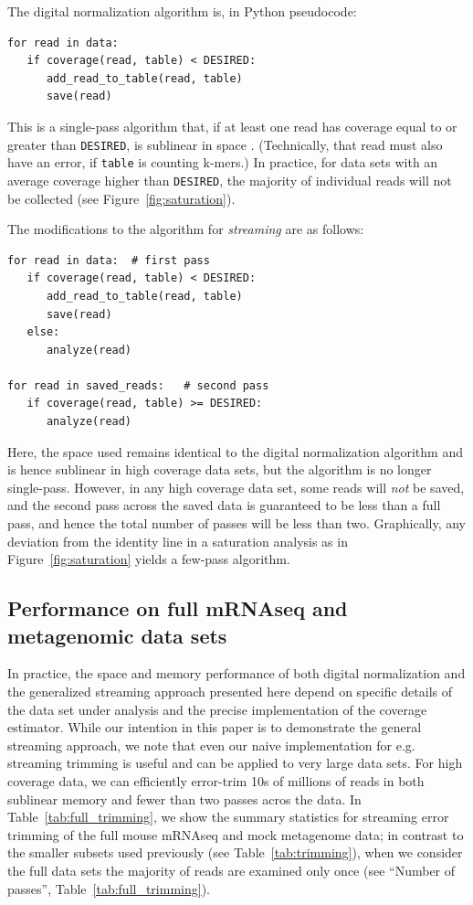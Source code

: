\documentclass{article}
\begin{document}
The digital normalization algorithm is, in Python pseudocode:
\begin{verbatim}
for read in data:
   if coverage(read, table) < DESIRED:
      add_read_to_table(read, table)
      save(read)
\end{verbatim}
This is a single-pass algorithm that, if at least one read has
coverage equal to or greater than {\tt DESIRED}, is sublinear in
space \cite{Brown2012}.  (Technically, that read must also have
an error, if {\tt table} is counting k-mers.)  In practice, for data
sets with an average coverage higher than {\tt DESIRED}, the majority
of individual reads will not be collected (see Figure~\ref{fig:saturation}).

The modifications to the algorithm for {\em streaming} are as follows:
\begin{verbatim}
for read in data:  # first pass
   if coverage(read, table) < DESIRED:
      add_read_to_table(read, table)
      save(read)
   else:
      analyze(read)

for read in saved_reads:   # second pass
   if coverage(read, table) >= DESIRED:
      analyze(read)
\end{verbatim}

Here, the space used remains identical to the digital normalization
algorithm and is hence sublinear in high coverage data sets, but the
algorithm is no longer single-pass.  However, in any high coverage
data set, some reads will {\em not} be saved, and the second pass
across the saved data is guaranteed to be less than a full pass, and
hence the total number of passes will be less than two.  Graphically,
any deviation from the identity line in a saturation analysis as in
Figure~\ref{fig:saturation} yields a few-pass algorithm.

\subsection{Performance on full mRNAseq and metagenomic data sets}

In practice, the space and memory performance of both digital
normalization and the generalized streaming approach presented here
depend on specific details of the data set under analysis and the
precise implementation of the coverage estimator. While our intention
in this paper is to demonstrate the general streaming approach, we
note that even our naive implementation for e.g. streaming trimming is
useful and can be applied to very large data sets.  For high coverage
data, we can efficiently error-trim 10s of millions of reads in both
sublinear memory and fewer than two passes acros the data.  In
Table~\ref{tab:full_trimming}, we show the summary statistics for
streaming error trimming of the full mouse mRNAseq and mock metagenome
data; in contrast to the smaller subsets used previously (see
Table~\ref{tab:trimming}), when we consider the full data sets the
majority of reads are examined only once (see ``Number of passes'',
Table~\ref{tab:full_trimming}).
\end{document}
